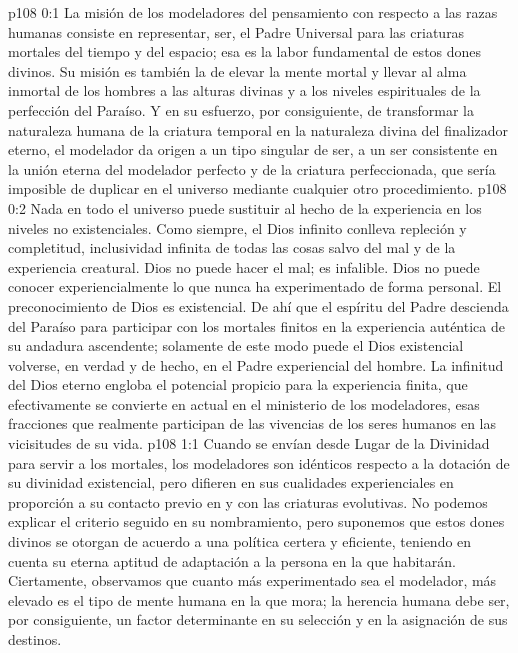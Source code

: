 \author{Mensajero solitario}
\vs p108 0:1 La misión de los modeladores del pensamiento con respecto a las razas humanas consiste en representar, ser, el Padre Universal para las criaturas mortales del tiempo y del espacio; esa es la labor fundamental de estos dones divinos. Su misión es también la de elevar la mente mortal y llevar al alma inmortal de los hombres a las alturas divinas y a los niveles espirituales de la perfección del Paraíso. Y en su esfuerzo, por consiguiente, de transformar la naturaleza humana de la criatura temporal en la naturaleza divina del finalizador eterno, el modelador da origen a un tipo singular de ser, a un ser consistente en la unión eterna del modelador perfecto y de la criatura perfeccionada, que sería imposible de duplicar en el universo mediante cualquier otro procedimiento.
\vs p108 0:2 \pc Nada en todo el universo puede sustituir al hecho de la experiencia en los niveles no existenciales. Como siempre, el Dios infinito conlleva repleción y completitud, inclusividad infinita de todas las cosas salvo del mal y de la experiencia creatural. Dios no puede hacer el mal; es infalible. Dios no puede conocer experiencialmente lo que nunca ha experimentado de forma personal. El preconocimiento de Dios es existencial. De ahí que el espíritu del Padre descienda del Paraíso para participar con los mortales finitos en la experiencia auténtica de su andadura ascendente; solamente de este modo puede el Dios existencial volverse, en verdad y de hecho, en el Padre experiencial del hombre. La infinitud del Dios eterno engloba el potencial propicio para la experiencia finita, que efectivamente se convierte en actual en el ministerio de los modeladores, esas fracciones que realmente participan de las vivencias de los seres humanos en las vicisitudes de su vida.
\vs p108 1:1 Cuando se envían desde Lugar de la Divinidad para servir a los mortales, los modeladores son idénticos respecto a la dotación de su divinidad existencial, pero difieren en sus cualidades experienciales en proporción a su contacto previo en y con las criaturas evolutivas. No podemos explicar el criterio seguido en su nombramiento, pero suponemos que estos dones divinos se otorgan de acuerdo a una política certera y eficiente, teniendo en cuenta su eterna aptitud de adaptación a la persona en la que habitarán. Ciertamente, observamos que cuanto más experimentado sea el modelador, más elevado es el tipo de mente humana en la que mora; la herencia humana debe ser, por consiguiente, un factor determinante en su selección y en la asignación de sus destinos.
